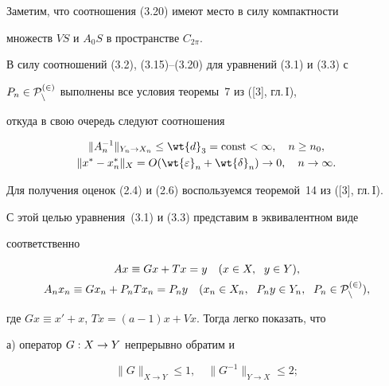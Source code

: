 Заметим, что соотношения (3.20) имеют место в силу компактности


множеств $VS$ и $A_0S$ в пространстве $C_{2\pi}$.





В силу соотношений (3.2), (3.15)--(3.20) для уравнений (3.1) и (3.3) с


$P_n\in \cal P_n^{(2)}$ выполнены все условия теоремы~7 из ([3], гл.\,I),


откуда в свою очередь следуют соотношения


\begin{gather}


\|A_n^{-1}\|_{Y_n\rightarrow X_n} \leq \wt{d}_3=\const<\infty ,


\quad n\geq n_0, \\


%


\|x^*-x_n^*\|_{X} = O (\wt{\varepsilon}_n+\wt{\delta}_n)


\rightarrow 0,\quad n\rightarrow \infty .


\end{gather}





Для получения оценок (2.4) и (2.6) воспользуемся теоремой~14 из ([3], гл.\,I).


С этой целью уравнения~(3.1) и (3.3) представим в эквивалентном виде


соответственно


\begin{gather}


Ax\equiv Gx+Tx=y\quad (x\in X,\ \; y\in Y), \\


%


A_nx_n\equiv Gx_n+P_nTx_n=P_ny\quad (x_n\in X_n,\ \; P_ny\in Y_n,


\ \;P_n\in \rukopis{P}_n^{(2)}),


\end{gather}


где $Gx\equiv x'+x$, $Tx=(a-1)x+Vx$. Тогда легко показать, что





а) оператор $G : X \to Y$ непрерывно обратим и


\begin{equation}


\|G\|_{X\rightarrow Y}


\leq 1,\quad \|G^{-1}\|_{Y\rightarrow X} \leq 2;


\end{equation}






